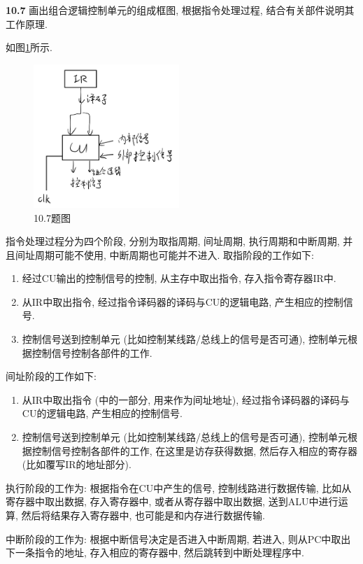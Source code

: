 \documentclass[UTF8]{report}
\newcommand{\problem}[1]{{\setlength{\parskip}{10pt}\noindent \bf{#1}}}
\newenvironment{solution}{{\noindent\hskip 2em \bf 解 \quad}}{}
\begin{document}
\newpage

\problem{10.7} 画出组合逻辑控制单元的组成框图, 根据指令处理过程, 结合有关部件说明其工作原理. 

\begin{solution}
    如图\ref{fig:10_7}所示.
    \begin{figure}[!htbp]
        \centering
        \includegraphics[width=5.5cm]{fig/10.7.png}
        \caption{10.7题图}
        \label{fig:10_7}
    \end{figure}

    指令处理过程分为四个阶段, 分别为取指周期, 间址周期, 执行周期和中断周期, 并且间址周期可能不使用, 中断周期也可能并不进入. 取指阶段的工作如下:

    \begin{enumerate}
        \item 经过CU输出的控制信号的控制, 从主存中取出指令, 存入指令寄存器IR中. 
        \item 从IR中取出指令, 经过指令译码器的译码与CU的逻辑电路, 产生相应的控制信号. 
        \item 控制信号送到控制单元 (比如控制某线路/总线上的信号是否可通), 控制单元根据控制信号控制各部件的工作.
    \end{enumerate}

    间址阶段的工作如下:

    \begin{enumerate}
        \item 从IR中取出指令 (中的一部分, 用来作为间址地址), 经过指令译码器的译码与CU的逻辑电路, 产生相应的控制信号. 
        \item 控制信号送到控制单元 (比如控制某线路/总线上的信号是否可通), 控制单元根据控制信号控制各部件的工作, 在这里是访存获得数据, 然后存入相应的寄存器 (比如覆写IR的地址部分).
    \end{enumerate}

    执行阶段的工作为: 根据指令在CU中产生的信号, 控制线路进行数据传输, 比如从寄存器中取出数据, 存入寄存器中, 或者从寄存器中取出数据, 送到ALU中进行运算, 然后将结果存入寄存器中, 也可能是和内存进行数据传输.

    中断阶段的工作为: 根据中断信号决定是否进入中断周期, 若进入, 则从PC中取出下一条指令的地址, 存入相应的寄存器中, 然后跳转到中断处理程序中.
\end{solution}
\end{document}
